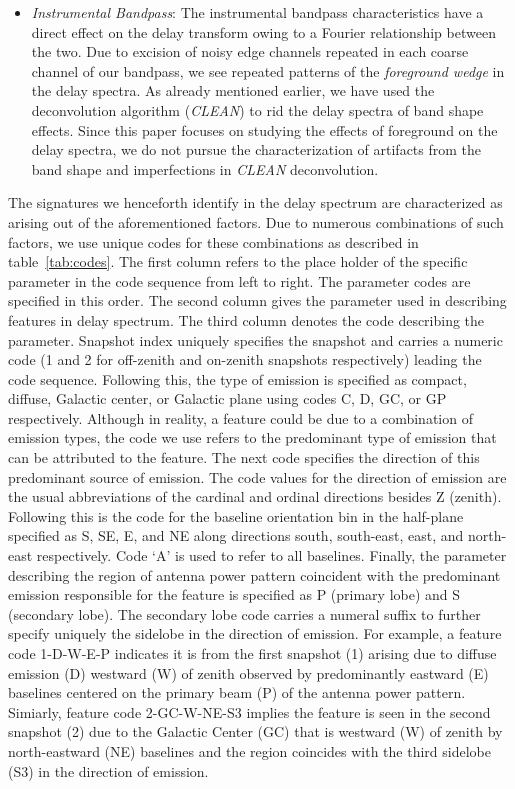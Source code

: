 \documentclass[preprint2,iop,numberedappendix]{emulateapj}
\begin{document}
\begin{itemize}
\item {\it Instrumental Bandpass}: The instrumental bandpass characteristics have a direct effect on the delay transform owing to a Fourier relationship between the two. Due to excision of noisy edge channels repeated in each coarse channel of our bandpass, we see repeated patterns of the {\it foreground wedge} in the delay spectra. As already mentioned earlier, we have used the deconvolution algorithm ({\it CLEAN}) to rid the delay spectra of band shape effects. Since this paper focuses on studying the effects of foreground on the delay spectra, we do not pursue the characterization of artifacts from the band shape and imperfections in {\it CLEAN} deconvolution.

\end{itemize}

The signatures we henceforth identify in the delay spectrum are characterized as arising out of the aforementioned factors. Due to numerous combinations of such factors, we use unique codes for these combinations as described in table~\ref{tab:codes}. The first column refers to the place holder of the specific parameter in the code sequence from left to right. The parameter codes are specified in this order. The second column gives the parameter used in describing features in delay spectrum. The third column denotes the code describing the parameter. Snapshot index uniquely specifies the snapshot and carries a numeric code (1 and 2 for off-zenith and on-zenith snapshots respectively) leading the code sequence. Following this, the type of emission is specified as compact, diffuse, Galactic center, or Galactic plane using codes C, D, GC, or GP respectively. Although in reality, a feature could be due to a combination of emission types, the code we use refers to the predominant type of emission that can be attributed to the feature. The next code specifies the direction of this predominant source of emission. The code values for the direction of emission are the usual abbreviations of the cardinal and ordinal directions besides Z (zenith). Following this is the code for the baseline orientation bin in the half-plane specified as S, SE, E, and NE along directions south, south-east, east, and north-east respectively. Code `A' is used to refer to all baselines. Finally, the parameter describing the region of antenna power pattern coincident with the predominant emission responsible for the feature is specified as P (primary lobe) and S (secondary lobe). The secondary lobe code carries a numeral suffix to further specify uniquely the sidelobe in the direction of emission. For example, a feature code 1-D-W-E-P indicates it is from the first snapshot (1) arising due to diffuse emission (D) westward (W) of zenith observed by predominantly eastward (E) baselines centered on the primary beam (P) of the antenna power pattern. Simiarly, feature code 2-GC-W-NE-S3 implies the feature is seen in the second snapshot (2) due to the Galactic Center (GC) that is westward (W) of zenith by north-eastward (NE) baselines and the region coincides with the third sidelobe (S3) in the direction of emission.
\end{document}
